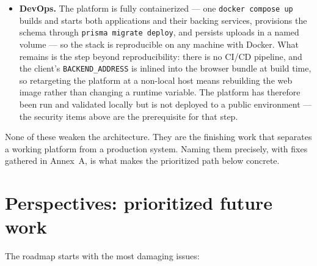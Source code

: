 \begin{itemize}
  \item \textbf{DevOps.} The platform is fully containerized --- one \texttt{docker compose up} builds and
  starts both applications and their backing services, provisions the schema through
  \texttt{prisma migrate deploy}, and persists uploads in a named volume --- so the stack is reproducible
  on any machine with Docker. What remains is the step beyond reproducibility: there is no CI/CD
  pipeline, and the client's \texttt{BACKEND\_ADDRESS} is inlined into the browser bundle at build time,
  so retargeting the platform at a non-local host means rebuilding the web image rather than changing a
  runtime variable. The platform has therefore been run and validated locally but is not deployed to a
  public environment --- the security items above are the prerequisite for that step.
\end{itemize}

None of these weaken the architecture. They are the finishing work that separates a working platform
from a production system. Naming them precisely, with fixes gathered in Annex~A, is what makes
the prioritized path below concrete.

\section*{Perspectives: prioritized future work}

The roadmap starts with the most damaging issues:

